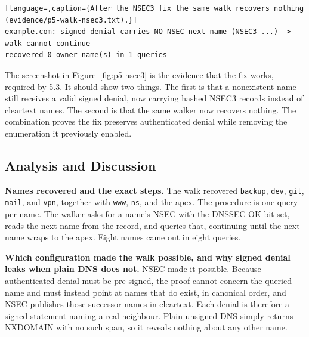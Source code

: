 \documentclass[11pt]{article}
\begin{document}
\begin{lstlisting}[language=,caption={After the NSEC3 fix the same walk recovers nothing (evidence/p5-walk-nsec3.txt).}]
example.com: signed denial carries NO NSEC next-name (NSEC3 ...) -> walk cannot continue
recovered 0 owner name(s) in 1 queries
\end{lstlisting}


The screenshot in Figure~\ref{fig:p5-nsec3} is the evidence that the fix works,
required by 5.3. It should show two things. The first is that a nonexistent name
still receives a valid signed denial, now carrying hashed NSEC3 records instead of
cleartext names. The second is that the same walker now recovers nothing. The
combination proves the fix preserves authenticated denial while removing the
enumeration it previously enabled.

\subsection{Analysis and Discussion}

\textbf{Names recovered and the exact steps.} The walk recovered \texttt{backup},
\texttt{dev}, \texttt{git}, \texttt{mail}, and \texttt{vpn}, together with
\texttt{www}, \texttt{ns}, and the apex. The procedure is one query per name. The
walker asks for a name's NSEC with the DNSSEC OK bit set, reads the next name from
the record, and queries that, continuing until the next-name wraps to the apex.
Eight names came out in eight queries.

\textbf{Which configuration made the walk possible, and why signed denial leaks
when plain DNS does not.} NSEC made it possible. Because authenticated denial must
be pre-signed, the proof cannot concern the queried name and must instead point at
names that do exist, in canonical order, and NSEC publishes those successor names
in cleartext. Each denial is therefore a signed statement naming a real neighbour.
Plain unsigned DNS simply returns NXDOMAIN with no such span, so it reveals nothing
about any other name.
\end{document}
